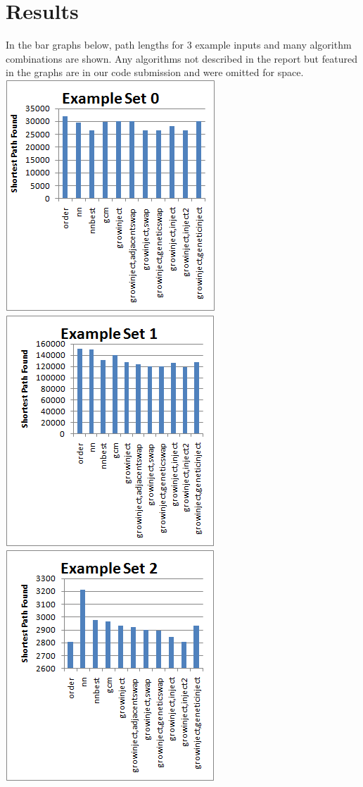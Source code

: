 \documentclass{article}
\begin{document}
\section*{Results}
In the bar graphs below, path lengths for 3 example inputs and many algorithm combinations are shown. Any algorithms not described in the report but featured in the graphs are in our code submission and were omitted for space.\\
\includegraphics[totalheight=0.27\textheight]{set0.png}\includegraphics[totalheight=0.27\textheight]{set1.png}\includegraphics[totalheight=0.27\textheight]{set2.png}
\end{document}
